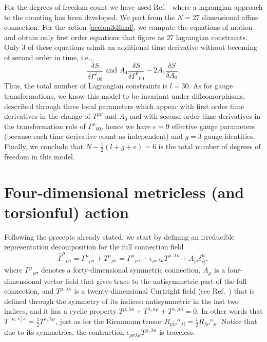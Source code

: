 \documentclass[twocolumn,aps,
  showpacs,showkeys,prd,superscriptaddress]{revtex4-1}
\renewcommand{\(}{\left(}
\renewcommand{\)}{\right)}
\renewcommand{\[}{\left[}
\renewcommand{\]}{\right]}
\begin{document}
For the degrees of freedom count we have used Ref.~\cite{Diaz:2014yua} where a lagrangian approach to the counting has been developed. We part from the $ N=27$ dimensional affine connection.  For the action \eqref{accion3dfinal}, we compute the equations of motion and obtain only first order equations that figure as 27 lagrangian constraints. Only 3 of these equations admit an additional time derivative without becoming of second order in time,  i.e., 
\begin{equation*}
  \frac{\delta S}{\delta\Gamma^i{}_{00}} \text{ and } A_4 \frac{\delta S}{\delta\Gamma^0{}_{00}} - 2 A_1 \frac{\delta S}{\delta A_{0}}.
\end{equation*}
Thus, the total number of Lagrangian constraints is $l=30$. As for gauge transformations, we know this model to be invariant under diffeomorphisms, described through three local parameters which appear with first order time derivatives in the change of $T^{\mu\nu}$ and $ A_0$ and with second order time derivatives in the transformation rule of $\Gamma^\mu{}_{00} $, hence we have $e=9$ effective gauge parameters (because each time derivative count as independent) and $g=3$ gauge identities. Finally,  we conclude that   $N-\frac{1}{2}(l+g+e)=6$ is the total number of degrees of freedom in this model. 


\section{\label{sec:4} Four-dimensional metricless (and torsionful) action}

Following the precepts  already stated, we start  by defining an irreducible representation decomposition for the full connection field 
\begin{equation}
  \hat{\Gamma}^\mu{}_{\rho\sigma} = {\Gamma}^\mu{}_{\rho\sigma} + T^\mu{}_{\rho\sigma} = {\Gamma}^\mu{}_{\rho\sigma} + \epsilon_{\rho\sigma\lambda\kappa}T^{\mu,\lambda\kappa}+A_{[\rho}\delta^\mu_{\nu]},
\end{equation}
where ${\Gamma}^\mu{}_{\rho\sigma}$ denotes a forty-dimensional symmetric connection, $A_\mu$ is a four-dimensional vector field  that gives trace to the antisymmetric part of the full connection, and  $T^{\mu,\lambda\kappa}$ is a twenty-dimensional Curtright field (see Ref.~\cite{Curtright:1980yk}) that is defined through the symmetry of its indices: antisymmetric in the last two indices, and it has a cyclic property $T^{\mu,\lambda\kappa}+T^{\lambda,\kappa\mu}+T^{\kappa,\mu\lambda}=0$. In other words that $T^{[\mu,\lambda]\kappa}=\frac{1}{2}T^{\kappa,\lambda\mu}$, just as for  the Riemmann tensor ${R}_{\mu[\nu}{}^\alpha{}_{\lambda]}=\frac{1}{2}{R}_{\lambda\nu}{}^\alpha{}_{\mu}$. Notice that due to its symmetries, the contraction $\epsilon_{\rho\sigma\lambda\kappa}T^{\mu,\lambda\kappa}$ is traceless.
\end{document}
